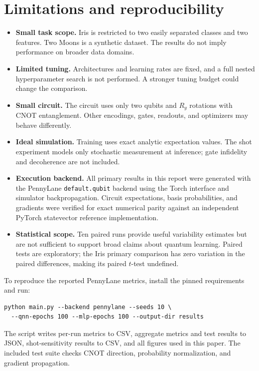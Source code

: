 \section{Limitations and reproducibility}\label{sec:repro}
\begin{itemize}
  \item \textbf{Small task scope.} Iris is restricted to two easily separated classes and two features. Two Moons is a synthetic dataset. The results do not imply performance on broader data domains.
  \item \textbf{Limited tuning.} Architectures and learning rates are fixed, and a full nested hyperparameter search is not performed. A stronger tuning budget could change the comparison.
  \item \textbf{Small circuit.} The circuit uses only two qubits and $R_y$ rotations with CNOT entanglement. Other encodings, gates, readouts, and optimizers may behave differently.
  \item \textbf{Ideal simulation.} Training uses exact analytic expectation values. The shot experiment models only stochastic measurement at inference; gate infidelity and decoherence are not included.
  \item \textbf{Execution backend.} All primary results in this report were generated with the PennyLane \texttt{default.qubit} backend using the Torch interface and simulator backpropagation. Circuit expectations, basis probabilities, and gradients were verified for exact numerical parity against an independent PyTorch statevector reference implementation.
  \item \textbf{Statistical scope.} Ten paired runs provide useful variability estimates but are not sufficient to support broad claims about quantum learning. Paired tests are exploratory; the Iris primary comparison has zero variation in the paired differences, making its paired $t$-test undefined.
\end{itemize}

To reproduce the reported PennyLane metrics, install the pinned requirements and run:
\begin{verbatim}
python main.py --backend pennylane --seeds 10 \
  --qnn-epochs 100 --mlp-epochs 100 --output-dir results
\end{verbatim}
The script writes per-run metrics to CSV, aggregate metrics and test results to JSON, shot-sensitivity results to CSV, and all figures used in this paper. The included test suite checks CNOT direction, probability normalization, and gradient propagation.

